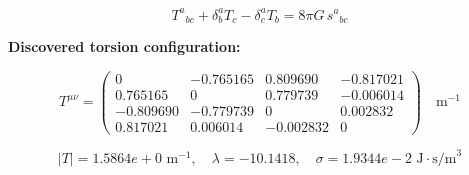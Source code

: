 
\begin{equation}
  T^a{}_{bc} + \delta^a_b T_c - \delta^a_c T_b = 8\pi G \, s^a{}_{bc}
\end{equation}

\textbf{Discovered torsion configuration:}

\begin{equation}
  T^{\mu\nu} = \begin{pmatrix}
    0 & -0.765165 & 0.809690 & -0.817021 \\
    0.765165 & 0 & 0.779739 & -0.006014 \\
    -0.809690 & -0.779739 & 0 & 0.002832 \\
    0.817021 & 0.006014 & -0.002832 & 0
  \end{pmatrix} \quad \text{m}^{-1}
\end{equation}

\begin{equation}
  |T| = 1.5864e+0 \text{ m}^{-1}, \quad
  \lambda = -10.1418, \quad
  \sigma = 1.9344e-2 \text{ J}\cdot\text{s/m}^3
\end{equation}